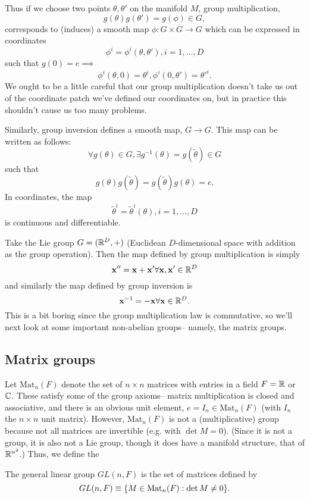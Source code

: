 Thus if we choose two points $\theta,\theta'$ on the manifold $M$, group multiplication,
$$g(\theta)g(\theta')=g(\phi)\in G,$$
corresponds to (induces) a smooth map $\phi: G\times G \to G$
which can be expressed in coordinates
$$\phi^i=\phi^i(\theta,\theta'), i=1,\ldots,D$$
such that $g(0)=e \implies$
$$\phi^i(\theta,0)=\theta^i, \phi^i(0,\theta')={\theta'}^i.$$
We ought to be a little careful that our group multiplication doesn't take us out of the coordinate patch we've defined our coordinates on, but in practice this shouldn't cause us too many problems.

Similarly, group inversion defines a smooth map, $G\to G$. This map can be written as follows:
$$\forall g(\theta)\in G, \exists g^{-1}(\theta)=g(\tilde \theta)\in G$$
such that $$g(\theta)g(\tilde\theta)=g(\tilde\theta)g(\theta)=e.$$
In coordinates, the map
$$\tilde \theta^i = \tilde\theta^i(\theta), i =1,\ldots, D$$
is continuous and differentiable.

\begin{exm}
Take the Lie group $G=(\mathbb{R}^D,+)$ (Euclidean $D$-dimensional space with addition as the group operation). Then the map defined by group multiplication is simply
$$\boldsymbol{\mathbf{x}}''=\boldsymbol{\mathbf{x}}+\boldsymbol{\mathbf{x}}' \forall \boldsymbol{\mathbf{x}},\boldsymbol{\mathbf{x}}'\in \mathbb{R}^D$$
and similarly the map defined by group inversion is
$$\boldsymbol{\mathbf{x}}^{-1}=-\boldsymbol{\mathbf{x}} \forall \boldsymbol{\mathbf{x}}\in \mathbb{R}^D.$$
This is a bit boring since the group multiplication law is commutative, so we'll next look at some important non-abelian groups-- namely, the matrix groups.
\end{exm}

\subsection*{Matrix groups} Let $\text{Mat}_n(F)$ denote the set of $n\times n$ matrices with entries in a field $F=\mathbb{R}$ or $\mathbb{C}$. These satisfy some of the group axioms-- matrix multiplication is closed and associative, and there is an obvious unit element, $e=I_n \in \text{Mat}_n(F)$ (with $I_n$ the $n\times n$ unit matrix). However, $\text{Mat}_n(F)$ is not a (multiplicative) group because not all matrices are invertible (e.g. with $\det M=0$). (Since it is not a group, it is also not a Lie group, though it does have a manifold structure, that of $\mathbb{R}^{n^2}$.) Thus, we define the 
\begin{defn}
The general linear group $GL(n,F)$ is the set of matrices defined by
\begin{equation}
GL(n,F)\equiv \{M\in \text{Mat}_n(F): \det M \neq 0\}.
\end{equation}
\end{defn}

